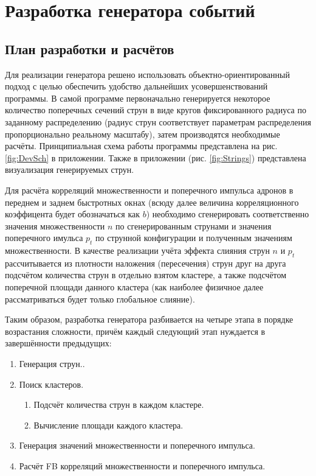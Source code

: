\section{Разработка генератора событий}
\subsection{План разработки и расчётов}
Для реализации генератора решено использовать объектно-ориентированный подход с целью обеспечить удобство дальнейших усовершенствований программы. В самой программе первоначально генерируется некоторое количество поперечных сечений струн в виде кругов фиксированного радиуса по заданному распределению (радиус струн соответствует параметрам распределения пропорционально реальному масштабу), затем производятся необходимые расчёты. Принципиальная схема работы программы представлена на рис. \ref{fig:DevSch} в приложении. Также в приложении (рис. \ref{fig:Strings}) представлена визуализация генерируемых струн. 

Для расчёта корреляций множественности и поперечного импульса адронов в переднем и заднем быстротных окнах (всюду далее величина корреляционного коэффицента будет обозначаться как $b$) необходимо сгенерировать соответственно значения множественности $n$ по сгенерированным струнами и значения поперечного имульса $p_t$ по струнной конфигурации и полученным значениям множественности. В качестве реализации учёта эффекта слияния струн $n$ и $p_t$ рассчитывается из плотности наложения (пересечения) струн друг на друга подсчётом количества струн в отдельно взятом кластере, а также подсчётом поперечной площади данного кластера (как наиболее физичное далее рассматриваться будет только глобальное слияние). 

Таким образом, разработка генератора разбивается на четыре этапа в порядке возрастания сложности, причём каждый следующий этап нуждается в завершённости предыдущих:
\begin{enumerate}[label=\arabic*.]
\item	Генерация струн..
\item	Поиск кластеров.
	\begin{enumerate}
	\item	Подсчёт количества струн в каждом кластере.
	\item	Вычисление площади каждого кластера.
	\end{enumerate}
\item	Генерация значений множественности и поперечного импульса.
\item	Расчёт FB корреляций множественности и поперечного импульса.
\end{enumerate}
